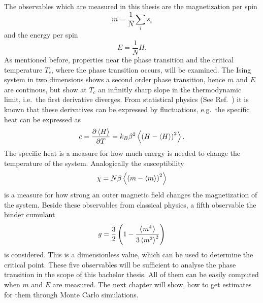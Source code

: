     The observables which are measured in this thesis are the
    magnetization per spin
    \begin{equation}
        m = \frac{1}{N} \sum_i s_i
    \end{equation}
    and the energy per spin
    \begin{equation}
        E = \frac{1}{N} H.
    \end{equation}
    As mentioned before, properties near the phase transition and the
    critical temperature \(T_c\), where the phase transition occurs, will
    be examined. The Ising system in two dimensions shows a second order
    phase transition, hence \(m\) and \(E\) are continous, but show at
    \(T_c\) an infinitly sharp slope in the thermodynamic limit, i.e.\
    the first derivative diverges.
    From statistical physics (See Ref.\ \cite{nolting2005}) it is known that
    these derivatives can be expressed by fluctuations, e.g.\ the specific
    heat can be expressed as
    \begin{equation}
        c = \frac{\partial \left< H \right>}{\partial T} = k_B \beta^2 \left< \left(H-\left< H \right>\right)^2 \right>.
    \end{equation}
    The specific heat is a measure for how much energy is needed to change
    the temperature of the system.
    Analogically the susceptibility
    \begin{equation}
        \chi = N \beta \left< \left(m-\left< m \right>\right)^2 \right>
    \end{equation}
    is a measure for how strong an outer magnetic field changes the
    magnetization of the system.
    Beside these observables from classical physics, a fifth observable
    the binder cumulant \cite{Binder1981}
    \begin{equation}
        g = \frac{3}{2}\left(1-\frac{\left< m^4 \right>}{3\left< m^2 \right>^2}\right)
        \label{eq:binder}
    \end{equation}
    is considered.
    This is a dimensionless value, which can be used to determine the
    critical point. These five observables will be sufficient to analyse
    the phase transition in the scope of this bachelor thesis. All of them
    can be easily computed when \(m\) and \(E\) are measured. The next
    chapter will show, how to get estimates for them through Monte Carlo
    simulations.

